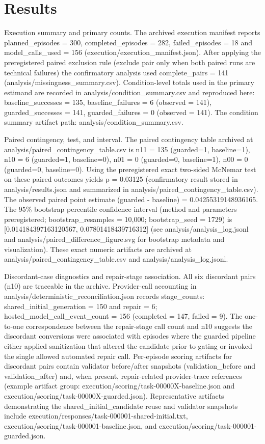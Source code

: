 \documentclass[conference]{IEEEtran}
\begin{document}
\section{Results}
Execution summary and primary counts. The archived execution manifest reports planned\_episodes = 300, completed\_episodes = 282, failed\_episodes = 18 and model\_calls\_used = 156 (execution/execution\_manifest.json). After applying the preregistered paired exclusion rule (exclude pair only when both paired runs are technical failures) the confirmatory analysis used complete\_pairs = 141 (analysis/missingness\_summary.csv). Condition-level totals used in the primary estimand are recorded in analysis/condition\_summary.csv and reproduced here: baseline\_successes = 135, baseline\_failures = 6 (observed = 141), guarded\_successes = 141, guarded\_failures = 0 (observed = 141). The condition summary artifact path: analysis/condition\_summary.csv.

Paired contingency, test, and interval. The paired contingency table archived at analysis/paired\_contingency\_table.csv is
n11 = 135 (guarded=1, baseline=1),
n10 = 6   (guarded=1, baseline=0),
n01 = 0   (guarded=0, baseline=1),
n00 = 0   (guarded=0, baseline=0).
Using the preregistered exact two-sided McNemar test on these paired outcomes yields p = 0.03125 (confirmatory result stored in analysis/results.json and summarized in analysis/paired\_contingency\_table.csv). The observed paired point estimate (guarded - baseline) = 0.04255319148936165. The 95\% bootstrap percentile confidence interval (method and parameters preregistered; bootstrap\_resamples = 10,000; bootstrap\_seed = 1729) is [0.014184397163120567, 0.07801418439716312] (see analysis/analysis\_log.jsonl and analysis/paired\_difference\_figure.svg for bootstrap metadata and visualization). These exact numeric artifacts are archived at analysis/paired\_contingency\_table.csv and analysis/analysis\_log.jsonl.

Discordant-case diagnostics and repair-stage association. All six discordant pairs (n10) are traceable in the archive. Provider-call accounting in analysis/deterministic\_reconciliation.json records stage\_counts: shared\_initial\_generation = 150 and repair = 6; hosted\_model\_call\_event\_count = 156 (completed = 147, failed = 9). The one-to-one correspondence between the repair-stage call count and n10 suggests the discordant conversions were associated with episodes where the guarded pipeline either applied sanitization that altered the candidate prior to gating or invoked the single allowed automated repair call. Per-episode scoring artifacts for discordant pairs contain validator before/after snapshots (validation\_before and validation\_after) and, when present, repair-related provider-trace references (example artifact group: execution/scoring/task-00000X-baseline.json and execution/scoring/task-00000X-guarded.json). Representative artifacts demonstrating the shared\_initial\_candidate reuse and validator snapshots include execution/responses/task-000001-shared-initial.txt, execution/scoring/task-000001-baseline.json, and execution/scoring/task-000001-guarded.json.
\end{document}
